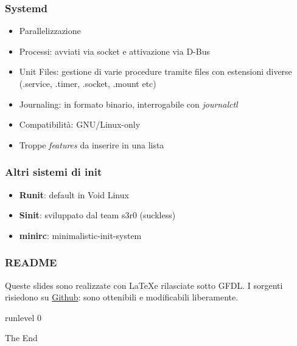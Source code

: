 \documentclass{beamer}
\begin{document}

\begin{frame}
	\frametitle{Systemd}
	\begin{itemize}
		\item Parallelizzazione
		\item Processi: avviati via socket e attivazione via D-Bus
		\item Unit Files: gestione di varie procedure tramite files con estensioni diverse (.service, .timer, .socket, .mount etc)
		\item Journaling: in formato binario, interrogabile con \textit{journalctl}
		\item Compatibilit\`a: GNU/Linux-only
		\item Troppe \textit{features} da inserire in una lista
	\end{itemize}
\end{frame}


\begin{frame}
	\frametitle{Altri sistemi di init}
	\begin{itemize}
		\item \textbf{Runit}: default in Void Linux
		\item \textbf{Sinit}: sviluppato dal team s3r0 (suckless)
		\item \textbf{minirc}: minimalistic-init-system
	\end{itemize}
\end{frame}


\begin{frame}
	\frametitle{README}
	Queste slides sono realizzate con \LaTeX  e rilasciate sotto GFDL.
	I sorgenti risiedono su \href{https://github.com/smlb/LinuxDay2014-smlb}{Github}: sono ottenibili e modificabili liberamente.
\end{frame}
\begin{frame}
\Huge{\centerline{runlevel 0}}
\huge{\centerline{The End}}
\end{frame}

\end{document}
